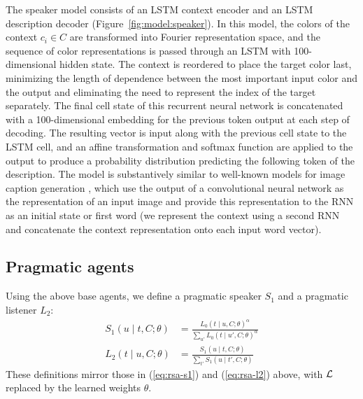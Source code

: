 \documentclass[11pt,letterpaper]{article}
\newcommand{\eq}[1]{(\ref{#1})}
\newcommand{\Listener}{L}
\newcommand{\Speaker}{S}
\newcommand{\utt}{u}
\newcommand{\referent}{c}
\newcommand{\context}{C}
\newcommand{\target}{t}
\renewcommand{\|}{\mid}
\newcommand{\figref}[1]{Figure~\ref{#1}}
\begin{document}
The speaker model consists of an LSTM context encoder
and an LSTM description decoder (\figref{fig:model:speaker}). In this model, the colors of the context
$\referent_i \in \context$ are transformed into Fourier representation space,
and the sequence of color representations is passed through an LSTM with
100-dimensional hidden state. The context is reordered to place the target color
last, minimizing the length of dependence between the most important input color
and the output \cite{Sutskever2014} and eliminating the need to represent the
index of the target separately.
The final cell state of this recurrent neural network is concatenated with a
100-dimensional embedding for the previous token output at each step of decoding.
The resulting vector is input along with the previous cell state to the LSTM cell,
and an affine transformation and softmax function are applied to the output to
produce a probability distribution predicting the following token of the description.
The model is substantively similar to well-known models for image caption generation
\cite{Karpathy2015,Vinyals2015}, which use the output of a convolutional neural
network as the representation of an input image and provide this representation
to the RNN as an initial state or first word (we represent the context using
a second RNN and concatenate the context representation onto each input word vector).

\subsection{Pragmatic agents}\label{sec:l2}

Using the above base agents, we define a pragmatic speaker
$\Speaker_{1}$ and a pragmatic listener
$\Listener_{2}$:
%
\begin{align}
\Speaker_1(\utt \| \target, \context; \theta)
  &= \frac{\Listener_0(\target \| \utt, \context; \theta)^\alpha}{\sum_{\utt'}
    \Listener_0(\target \| \utt', \context; \theta)^\alpha}
    \label{eq:s1} \\
  \Listener_2(\target \| \utt, \context; \theta)
  &=
    \frac{
    \Speaker_1(\utt \| \target, \context; \theta)
    }{
    \sum_{\target'} \Speaker_1(\utt \| \target', \context; \theta)
    }
\end{align}
These definitions mirror those in \eq{eq:rsa-s1} and \eq{eq:rsa-l2}
above, with $\mathcal{L}$ replaced by the learned weights $\theta$.
\end{document}
